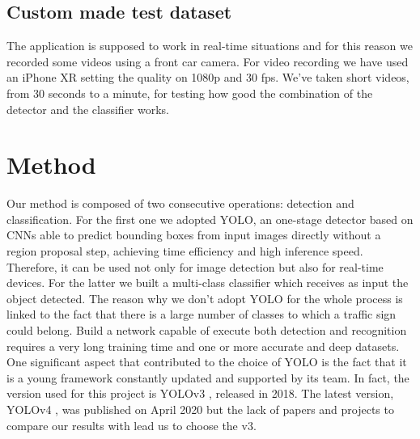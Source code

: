 \documentclass[10pt,twocolumn,letterpaper]{article}
\begin{document}
\subsection{Custom made test dataset}
The application is supposed to work in real-time situations and for this reason we recorded some videos using a front car camera. For video recording we have used an iPhone XR setting the quality on 1080p and 30 fps. We've taken short videos, from 30 seconds to a minute, for testing how good the combination of the detector and the classifier works.
\section{Method}
Our method is composed of two consecutive operations: detection and classification. For the first one we adopted YOLO, an one-stage detector based on CNNs able to predict bounding boxes from input images directly without a region proposal step, achieving time efficiency and high inference speed. Therefore, it can be used not only for image detection but also for real-time devices. For the latter we built a multi-class classifier which receives as input the object detected. The reason why we don't adopt YOLO for the whole process is linked to the fact that there is a large number of classes to which a traffic sign could belong. Build a network capable of execute both detection and recognition requires a very long training time and one or more accurate and deep datasets.\\ 
One significant aspect that contributed to the choice of YOLO is the fact that it is a young framework constantly updated and supported by its team. In fact, the version used for this project is YOLOv3 \cite{yolov3}, released in 2018. The latest version, YOLOv4 \cite{yolov4}, was published on April 2020 but the lack of papers and projects to compare our results with lead us to choose the v3. 
\end{document}

